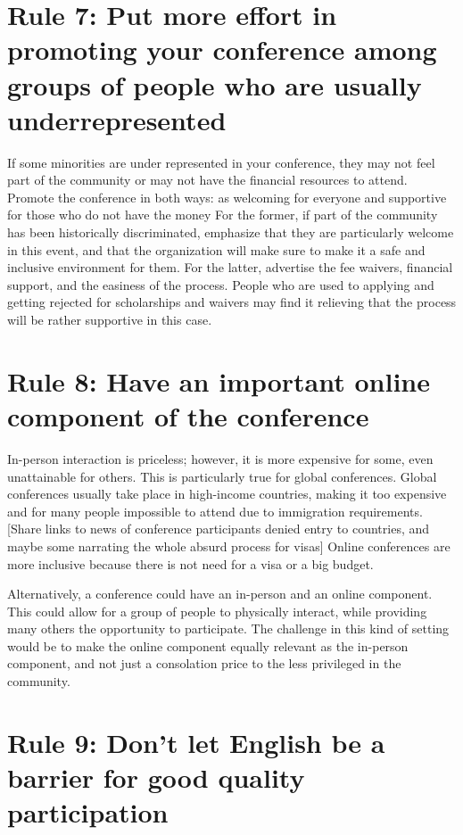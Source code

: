 \documentclass[10pt,letterpaper]{article}
\begin{document}
\section*{Rule 7: Put more effort in promoting your conference among groups of people who are usually underrepresented}

If some minorities are under represented in your conference, they may not feel part of the community or may not have the financial resources to attend. Promote the conference in both ways: as welcoming for everyone and supportive for those who do not have the money %
For the former, if part of the community has been historically discriminated, emphasize that they are particularly welcome in this event, and that the organization will make sure to make it a safe and inclusive environment for them. For the latter, advertise the fee waivers, financial support, and the easiness of the process. People who are used to applying and getting rejected for scholarships and waivers may find it relieving that the process will be rather supportive in this case. 


\section*{Rule 8: Have an important online component of the conference} 

In-person interaction is priceless; however, it is more expensive for some, even unattainable for others. This is particularly true for global conferences. Global conferences usually take place in high-income countries, making it too expensive and for many people impossible to attend due to immigration requirements. [Share links to news of conference participants denied entry to countries, and maybe some narrating the whole absurd process for visas] Online conferences are more inclusive because there is not need for a visa or a big budget. 

Alternatively, a conference could have an in-person and an online component. This could allow for a group of people to physically interact, while providing many others the opportunity to participate. The challenge in this kind of setting would be to make the online component equally relevant as the in-person component, and not just a consolation price to the less privileged in the community. 

\section*{Rule 9: Don't let English be a barrier for good quality participation}
\end{document}
